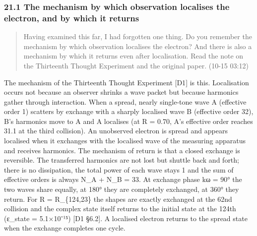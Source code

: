 \documentclass[
  a4paper,
]{article}
\begin{document}
\subsubsection{21.1 The mechanism by which observation localises the
electron, and by which it
returns}\label{the-mechanism-by-which-observation-localises-the-electron-and-by-which-it-returns}

\begin{quote}
Having examined this far, I had forgotten one thing. Do you remember the
mechanism by which observation localises the electron? And there is also
a mechanism by which it returns even after localisation. Read the note
on the Thirteenth Thought Experiment and the original paper. (10-15
03:12)
\end{quote}

The mechanism of the Thirteenth Thought Experiment {[}D1{]} is this.
Localisation occurs not because an observer shrinks a wave packet but
because harmonics gather through interaction. When a spread, nearly
single-tone wave A (effective order 1) scatters by exchange with a
sharply localised wave B (effective order 32), B's harmonics move to A
and A localises (at R = 0.70, A's effective order reaches 31.1 at the
third collision). An unobserved electron is spread and appears localised
when it exchanges with the localised wave of the measuring apparatus and
receives harmonics. The mechanism of return is that a closed exchange is
reversible. The transferred harmonics are not lost but shuttle back and
forth; there is no dissipation, the total power of each wave stays 1 and
the sum of effective orders is always N\_A + N\_B = 33. At exchange
phase kω = 90° the two waves share equally, at 180° they are completely
exchanged, at 360° they return. For R = R\_\{124,23\} the shapes are
exactly exchanged at the 62nd collision and the complex state itself
returns to the initial state at the 124th (ε\_state = 5.1×10⁻¹⁵) {[}D1
§6.2{]}. A localised electron returns to the spread state when the
exchange completes one cycle.
\end{document}
